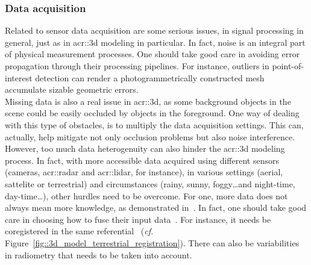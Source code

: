         \subsubsection{Data acquisition}
            Related to sensor data acquisition are some serious issues, in signal processing in general, just as in \gls{acr::3d} modeling in particular.
            In fact, noise is an integral part of physical measurement processes.
            One should take good care in avoiding error propagation through their processing pipelines.
            For instance, outliers in point-of-interest detection can render a photogrammetrically constructed mesh accumulate sizable geometric errors.\\
            Missing data is also a real issue in \gls{acr::3d}, as some background objects in the scene could be easily occluded by objects in the foreground.
            One way of dealing with this type of obstacles, is to multiply the data acquisition settings.
            This can, actually, help mitigate not only occlusion problems but also noise interference.\\
            However, too much data heterogenuity can also hinder the \gls{acr::3d} modeling process.
            In fact, with more accessible data acquired using different sensors (cameras, \gls{acr::radar} and \gls{acr::lidar}, for instance), in various settings (aerial, sattelite or terrestrial) and circumstances (rainy, sunny, foggy\dots and night-time, day-time\dots), other hurdles need to be overcome.
            For one, more data does not always mean more knowledge, as demonstrated in~\textcite{brachmann2018learning}.
            In fact, one should take good care in choosing how to fuse their input data~\parencite{kedzierski2014terrestrial}.
            For instance, it needs be coregistered in the same referential~\parencite{monnier2013registration, mezian2016uncertainty} (\textit{cf.} Figure~\ref{fig::3d_model_terrestrial_registration}).
            There can also be variabilities in radiometry that needs to be taken into account.\addref
